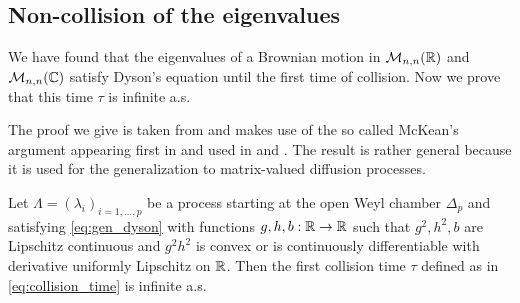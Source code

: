 \subsection{Non-collision of the eigenvalues}

We have found that the eigenvalues of a Brownian motion in $\mathcal M_{n,n}(\mathbb R)$ and $\mathcal M_{n,n}(\mathbb C)$ satisfy Dyson's equation until the first time of collision. Now we prove that this time $\tau$ is infinite a.s. 

The proof we give is taken from \cite{article:multiyamada} and makes use of the so called McKean's argument appearing first in \cite{book:mckean} and used in \cite{bru1989diffusions} and \cite{thesis_trujillo}. The result is rather general because it is used for the generalization to matrix-valued diffusion processes.

\begin{theorem} \label{thm:collision}
    Let $\Lambda = (\lambda_i)_{i=1,\dots,p}$ be a process starting at the open Weyl chamber $\Delta_p$ and satisfying \eqref{eq:gen_dyson} with functions $g,h,b:\mathbb R \to \mathbb R$ such that $g^2, h^2, b$ are Lipschitz continuous and $g^2h^2$ is convex or is continuously differentiable with derivative uniformly Lipschitz on $\mathbb R$. Then the first collision time $\tau$ defined as in \eqref{eq:collision_time} is infinite a.s.
\end{theorem}

